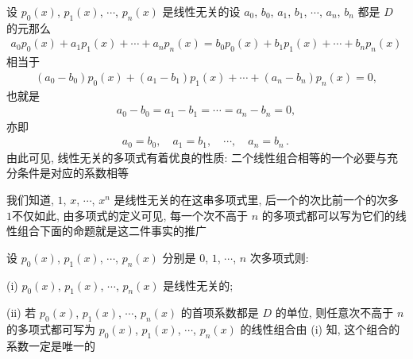 \begin{remark}
    设 $p_0 (x)$, $p_1 (x)$, $\cdots$, $p_n (x)$ 是线性无关的\period 设 $a_0$, $b_0$, $a_1$, $b_1$, $\cdots$, $a_n$, $b_n$ 都是 $D$ 的元\period 那么
    \begin{align*}
        a_0 p_0 (x) + a_1 p_1 (x) + \cdots + a_n p_n (x) = b_0 p_0 (x) + b_1 p_1 (x) + \cdots + b_n p_n (x)
    \end{align*}
    相当于
    \begin{align*}
        (a_0 - b_0) p_0 (x) + (a_1 - b_1) p_1 (x) + \cdots + (a_n - b_n) p_n (x) = 0,
    \end{align*}
    也就是
    \begin{align*}
        a_0 - b_0 = a_1 - b_1 = \cdots = a_n - b_n = 0,
    \end{align*}
    亦即
    \begin{align*}
        a_0 = b_0, \quad a_1 = b_1, \quad \cdots, \quad a_n = b_n \period
    \end{align*}
    由此可见, 线性无关的多项式有着优良的性质: 二个线性组合相等的一个必要与充分条件是对应的系数相等\period
\end{remark}

我们知道, $1$, $x$, $\cdots$, $x^n$ 是线性无关的\period 在这串多项式里, 后一个的次比前一个的次多 $1$\period 不仅如此, 由多项式的定义可见, 每一个次不高于 $n$ 的多项式都可以写为它们的线性组合\period 下面的命题就是这二件事实的推广\period

\begin{proposition}
    设 $p_0 (x)$, $p_1 (x)$, $\cdots$, $p_n (x)$ 分别是 $0$, $1$, $\cdots$, $n$ 次多项式\period 则:

    (i) $p_0 (x)$, $p_1 (x)$, $\cdots$, $p_n (x)$ 是线性无关的;

    (ii) 若 $p_0 (x)$, $p_1 (x)$, $\cdots$, $p_n (x)$ 的首项系数都是 $D$ 的单位, 则任意次不高于 $n$ 的多项式都可写为 $p_0 (x)$, $p_1 (x)$, $\cdots$, $p_n (x)$ 的线性组合\period 由 (i) 知, 这个组合的系数一定是唯一的\period
\end{proposition}

